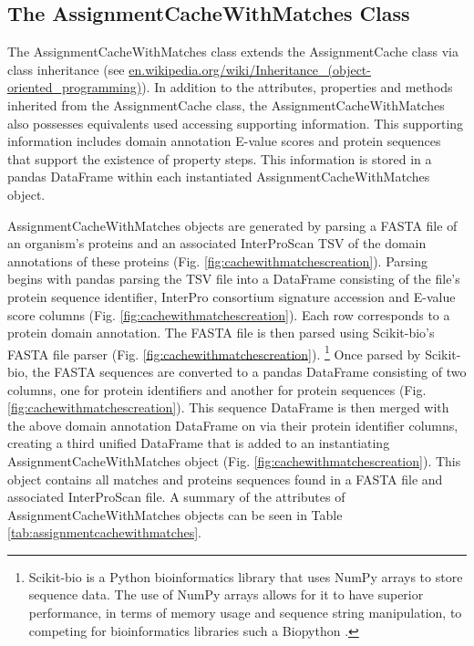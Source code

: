 \subsection{The AssignmentCacheWithMatches Class}

The AssignmentCacheWithMatches class extends the AssignmentCache class via class inheritance \cite{snyder1986encapsulation} (see \href{en.wikipedia.org/wiki/Inheritance\_(object-oriented\_programming)}{en.wikipedia.org/wiki/Inheritance\_(object-oriented\_programming)}). In addition to the attributes, properties and methods inherited from the AssignmentCache class, the AssignmentCacheWithMatches also possesses equivalents used accessing supporting information. This supporting information includes domain annotation E-value scores and protein sequences that support the existence of property steps. This information is stored in a pandas DataFrame within each instantiated AssignmentCacheWithMatches object. 

AssignmentCacheWithMatches objects are generated by parsing a FASTA file \cite{pearson19905} of an organism's proteins and an associated InterProScan TSV of the domain annotations of these proteins (Fig. \ref{fig:cachewithmatchescreation}). Parsing begins with pandas parsing the TSV file into a DataFrame consisting of the file's protein sequence identifier, InterPro consortium signature accession and E-value score columns (Fig. \ref{fig:cachewithmatchescreation}). Each row corresponds to a protein domain annotation. The FASTA file is then parsed using Scikit-bio's FASTA file parser (Fig. \ref{fig:cachewithmatchescreation})\cite{scikitbio}. \footnote{Scikit-bio is a Python bioinformatics library that uses NumPy arrays to store sequence data. The use of NumPy arrays allows for it to have superior performance, in terms of memory usage and sequence string manipulation, to competing for bioinformatics libraries such a Biopython \cite{cock2009biopython}.} Once parsed by Scikit-bio, the FASTA sequences are converted to a pandas DataFrame consisting of two columns, one for protein identifiers and another for protein sequences (Fig. \ref{fig:cachewithmatchescreation}). This sequence DataFrame is then merged with the above domain annotation DataFrame on via their protein identifier columns, creating a third unified DataFrame that is added to an instantiating AssignmentCacheWithMatches object (Fig. \ref{fig:cachewithmatchescreation}). This object contains all matches and proteins sequences found in a FASTA file and associated InterProScan file. A summary of the attributes of AssignmentCacheWithMatches objects can be seen in Table \ref{tab:assignmentcachewithmatches}.

